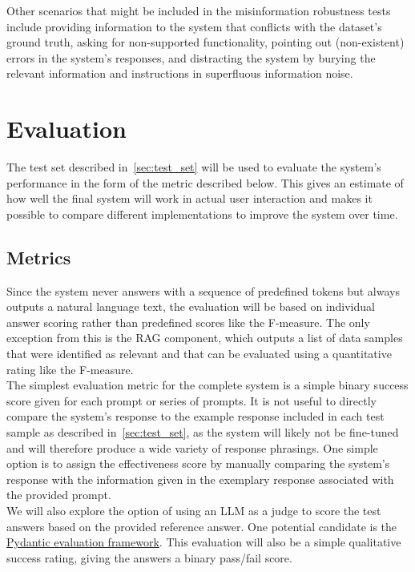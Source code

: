 \documentclass{article}
\begin{document}
Other scenarios that might be included in the misinformation robustness tests include providing information to the system that conflicts with the dataset's ground truth, asking for non-supported functionality, pointing out (non-existent) errors in the system's responses, and distracting the system by burying the relevant information and instructions in superfluous information noise.

\section{Evaluation}
The test set described in~\cref{sec:test_set} will be used to evaluate the system's performance in the form of the metric described below. This gives an estimate of how well the final system will work in actual user interaction and makes it possible to compare different implementations to improve the system over time.

\subsection{Metrics}
Since the system never answers with a sequence of predefined tokens but always outputs a natural language text, the evaluation will be based on individual answer scoring rather than predefined scores like the F-measure. The only exception from this is the RAG component, which outputs a list of data samples that were identified as relevant and that can be evaluated using a quantitative rating like the F-measure.\\

The simplest evaluation metric for the complete system is a simple binary success score given for each prompt or series of prompts. It is not useful to directly compare the system's response to the example response included in each test sample as described in~\cref{sec:test_set}, as the system will likely not be fine-tuned and will therefore produce a wide variety of response phrasings. One simple option is to assign the effectiveness score by manually comparing the system's response with the information given in the exemplary response associated with the provided prompt.\\

We will also explore the option of using an LLM as a judge to score the test answers based on the provided reference answer. One potential candidate is the \href{https://ai.pydantic.dev/evals/#evaluation-with-llmjudge}{Pydantic evaluation framework}. This evaluation will also be a simple qualitative success rating, giving the answers a binary pass/fail score.\\
\end{document}
